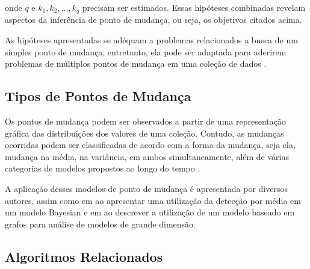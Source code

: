 onde $q$ e $k_1, k_2, ..., k_q$ precisam ser estimados. Essas hipóteses combinadas revelam aspectos da inferência de ponto de mudança, ou seja, os objetivos citados acima.

As hipóteses apresentadas se adéquam a problemas relacionados a busca de um simples ponto de mudança, entretanto, ela pode ser adaptada para aderirem problemas de múltiplos pontos de mudança em uma coleção de dados \cite{Chen1-2000}.

\subsection{Tipos de Pontos de Mudança}

Os pontos de mudança podem ser observados a partir de uma representação gráfica das distribuições dos valores de uma coleção. Contudo, as mudanças ocorridas podem ser classificadas de acordo com a forma da mudança, seja ela, mudança na média, na variância, em ambos simultaneamente, além de várias categorias de modelos propostos ao longo do tempo \cite{Chen2-2000}.

A aplicação desses modelos de ponto de mudança é apresentada por diversos autores, assim como em \cite{Cheon2010} ao apresentar uma utilização da detecção por média em um modelo Bayesian e em \cite{Shi2017} ao descrever a utilização de um modelo baseado em grafos para análise de modelos de grande dimensão.





\subsection{Algoritmos Relacionados}


